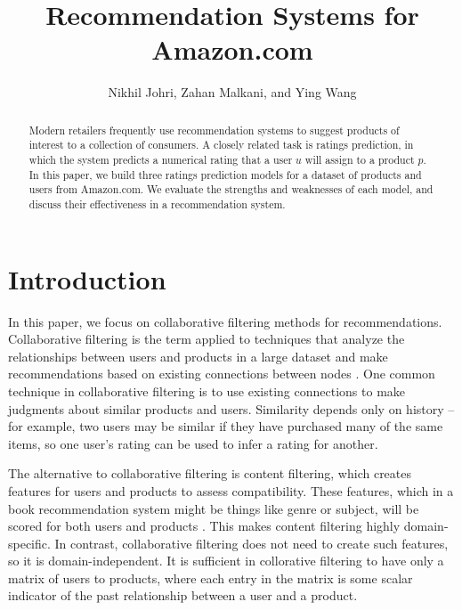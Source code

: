 \documentclass[letterpaper, 10 pt, conference]{ieeeconf}
\title{\LARGE \bf
Recommendation Systems for Amazon.com
}
\author{Nikhil Johri, Zahan Malkani, and Ying Wang
}
\begin{document}
\maketitle
\thispagestyle{empty}
\pagestyle{empty}


\begin{abstract}
Modern retailers frequently use recommendation systems to suggest products of 
interest to a collection of consumers. A closely related task is ratings 
prediction, in which the system predicts a numerical rating that a 
user $u$ will assign to a product $p$. In this paper, we build three ratings 
prediction models for a dataset of products and users from Amazon.com. We 
evaluate the strengths and weaknesses of each model, and discuss their 
effectiveness in a recommendation system.

\end{abstract}

\section{Introduction}
In this paper, we focus on collaborative filtering methods for recommendations. 
Collaborative filtering is the term applied to techniques that analyze the 
relationships between users and products in a large dataset and make 
recommendations based on existing connections between nodes \cite{bib:recsys}.
One common technique in collaborative filtering is to use existing connections 
to make judgments about similar products and users. Similarity depends only on 
history -- for example, two users may be similar if they have purchased many 
of the same items, so one user's rating can be used to infer a rating for 
another. 

The alternative to collaborative filtering is content filtering, which 
creates features for users and products to assess compatibility. These 
features, which in a book recommendation system might be things like genre or 
subject, will be scored for both users and products \cite{bib:recsys}. This 
makes content filtering highly domain-specific. 
In contrast, collaborative filtering does not need to create such features, 
so it is domain-independent. It is sufficient in collorative filtering to have 
only a matrix of users to products, where each entry in the matrix is some 
scalar indicator of the past relationship between a user and a product.
\end{document}
